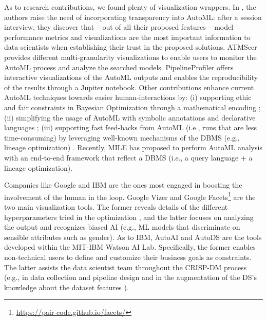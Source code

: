 As to research contributions, we found plenty of visualization wrappers.
In \cite{drozdal2020trust}, the authors raise the need of incorporating transparency into AutoML: after a session interview, they discover that -- out of all their proposed features -- model performance metrics and visualizations are the most important information to data scientists when establishing their trust in the proposed solutions.
ATMSeer \cite{wang2019atmseer} provides different multi-granularity visualizations to enable users to monitor the AutoML process and analyze the searched models.
PipelineProfiler \cite{ono2020pipelineprofiler} offers interactive visualizations of the AutoML outputs and enables the reproducibility of the results through a Jupiter notebook.
Other contributions enhance current AutoML techniques towards easier human-interactions by: (i) supporting ethic and fair constraints in Bayesian Optimization through a mathematical encoding \cite{perrone2021fair, yaghini2021human}; (ii) simplifying the usage of AutoML with symbolic annotations \cite{peng2020pyglove} and declarative languages \cite{kraska2013mlbase}; (iii) supporting fast feed-backs from AutoML (i.e., runs that are less time-consuming) by leveraging well-known mechanisms of the DBMS (e.g., lineage optimization) \cite{vartak2015supporting, xin2018accelerating}.
Recently, MILE \cite{lee2020human} has proposed to perform AutoML analysis with an end-to-end framework that reflect a DBMS (i.e., a query language + a lineage optimization).

Companies like Google and IBM are the ones most engaged in boosting the involvement of the human in the loop.
Google Vizer \cite{golovin2017google} and Google Facets\footnote{\url{https://pair-code.github.io/facets/}} are the two main visualization tools.
The former reveals details of the different hyperparameters tried in the optimization \cite{golovin2017google}, and the latter focuses on analyzing the output and recognizes biased AI (e.g., ML models that discriminate on sensible attributes such as gender).
As to IBM, AutoAI \cite{wang2020autoai} and AutoDS \cite{wang2021autods} are the tools developed within the MIT-IBM Watson AI Lab.
Specifically, the former enables non-technical users to define and customize their business goals as constraints. 
The latter assists the data scientist team throughout the CRISP-DM process (e.g., in data collection and pipeline design \cite{muller2019data, wang2021autods} and in the augmentation of the DS's knowledge about the dataset features \cite{drozdal2020trust}).

